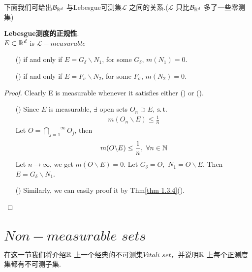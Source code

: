 	\vspace{2em}
	下面我们可给出$\mathcal{B}_{\mathbb{R}^d}$ 与Lebesgue可测集$\mathcal{L}$ 之间的关系.($\mathcal{L}$ 只比$\mathcal{B}_{\mathbb{R}^d}$ 多了一些零测集)
	\begin{thm}\label{thm 1.4.1}
		\textbf{Lebesgue测度的正规性}. \\
		$E \subset \mathbb{R}^d$ is $\mathcal{L}-measurable$
		\begin{enumerate}
			\item[(\rmnum{1})]if and only if $E = G_\delta \backslash N_1$, for some $G_\delta$, $m(N_1) = 0$.
			
			\item[(\rmnum{2})]if and only if $E = F_\sigma \backslash N_2$, for some $F_\sigma$, $m(N_2) = 0$.
		\end{enumerate}
	
		\vspace{2em}
		\begin{proof}
			Clearly E is measurable whenever it satisfies either () or ().
			\begin{enumerate}
				\item[(\rmnum{1})]Since $E$ is measurable, $\exists$ open sets $O_n \supset E$, $\operatorname{s.t.}$
				\begin{align}
					m(O_n \backslash E) \leq \frac{1}{n}
				\end{align}
				Let $O = \overset{\infty}{\underset{j = 1}{\bigcap}}{O_j}$, then
				\begin{align}
					m(O \backslash E) \leq \frac{1}{n} , \,\, \forall n \in \mathbb{N}
				\end{align}
				Let $n \to \infty$, we get $m(O \backslash E) = 0$. Let $G_\delta = O , \,\, N_1 = O \backslash E$. Then $E = G_\delta \backslash N_1$.
				
				\item[()]Similarly, we can easily proof it by Thm\ref{thm 1.3.4}(\rmnum{2}).
			\end{enumerate}
		\end{proof}
	\end{thm}

\newpage
\section{$Non-measurable \,\, sets$}
	在这一节我们将介绍$\mathbb{R}$ 上一个经典的不可测集$Vitali \,\, set$，并说明$\mathbb{R}$ 上每个正测度集都有不可测子集.
